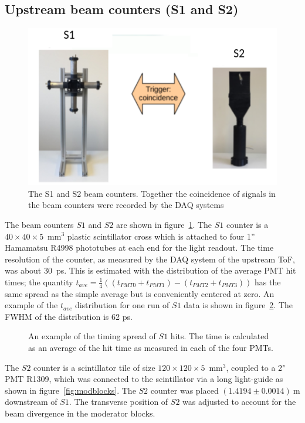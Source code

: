 \subsection{Upstream beam counters (S1 and S2)}
\label{subsec:s1s2Exp}
\begin{figure}
  \centering
  \includegraphics[width=0.65\linewidth]{files/Figures/S1S2FrontOn.png}
  \caption{The S1 and S2 beam counters. Together the coincidence of signals in the beam counters were recorded by the DAQ systems}
  \label{fig:S1S2headon}
\end{figure}
The beam counters $\mathit{S1}$ and $\mathit{S2}$ are shown in figure~\ref{fig:S1S2headon}.
The $\mathit{S1}$ counter is a $40\times40\times5$~mm$^3$ plastic scintillator cross which is attached to four 1'' Hamamatsu R4998 phototubes at each end for the light readout.
The time resolution of the counter, as measured by the DAQ system of the upstream ToF, was about 30~ps. This is estimated with the distribution of the average PMT hit times; the quantity $t_{ave}=\frac{1}{4}((t_{PMT0}+t_{PMT1})-(t_{PMT2}+t_{PMT3}))$ has the same spread as the simple average but is conveniently centered at zero.
An example of the $t_{ave}$ distribution for one run of $\mathit{S1}$ data is shown in figure~\ref{fig:s1Res}. The FWHM of the distribution is 62 ps.

\begin{figure}
  \begin{adjustbox}{width=0.7\linewidth, center}
    
  \end{adjustbox}
  \caption{An example of the timing spread of $\mathit{S1}$ hits. The time is calculated as an average of the hit time as measured in each of the four PMTs.}
  \label{fig:s1Res}
\end{figure}

The $\mathit{S2}$ counter is a scintillator tile of size $120\times120\times5$~mm$^3$, coupled to a 2" PMT R1309, which was connected to the scintillator via a long light-guide as shown in figure~\ref{fig:modblocks}.
The $\mathit{S2}$ counter was placed $(1.4194 \pm 0.0014)~\text{m}$ downstream of $\mathit{S1}$.
The transverse position of $\mathit{S2}$ was adjusted to account for the beam divergence in the moderator blocks.

